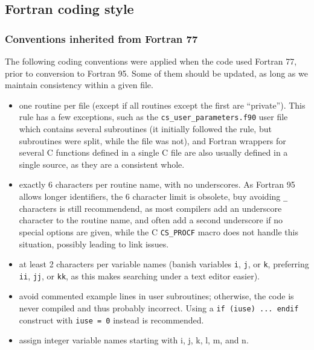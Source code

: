\subsection{Fortran coding style}

\subsubsection{Conventions inherited from Fortran 77}

The following coding conventions were applied when the code used
Fortran 77, prior to conversion to Fortran 95. Some of them should be
updated, as long as we maintain consistency within a given
file.

\begin{itemize}

\item one routine per file (except if all routines except the first
      are ``private''). This rule has a few exceptions, such as the
      \texttt{cs\_user\_parameters.f90} user file which contains several
      subroutines (it initially followed the rule, but subroutines were split,
      while the file was not), and Fortran wrappers for several C
      functions defined in a single C file are also usually defined
      in a single source, as they are a consistent whole.
 
\item exactly 6 characters per routine name, with no underscores.
      As Fortran 95 allows longer identifiers, the 6 character limit is
      obsolete, buy avoiding \texttt{\_} characters is still recommendend,
      as most compilers add an underscore character to the routine name,
      and often add a second underscore if no special options are given,
      while the C \texttt{CS\_PROCF} macro does not handle this situation,
      possibly leading to link issues.

\item at least 2 characters per variable names 
      (banish variables \texttt{i}, \texttt{j}, or \texttt{k},
       preferring \texttt{ii}, \texttt{jj}, or \texttt{kk}, as this makes
       searching under a text editor easier).

\item avoid commented example lines in user subroutines; otherwise,
      the code is never compiled and thus probably incorrect.
      Using a \texttt{if (iuse) ... endif} construct with
      \texttt{iuse = 0} instead is recommended.

\item assign integer variable names starting with i, j, k, l, m, and n. 


\end{itemize}
